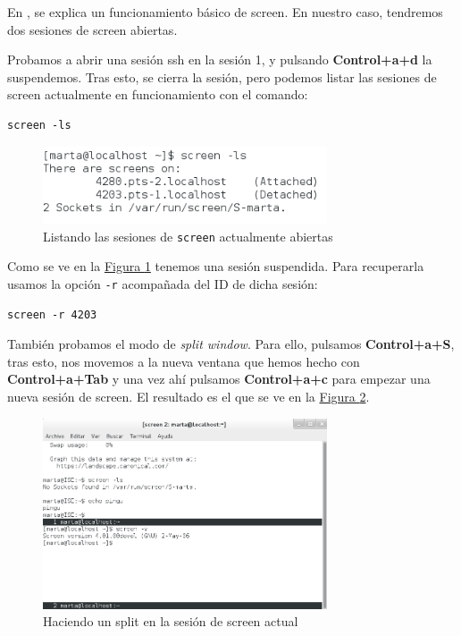 \documentclass[10pt,a4paper,spanish]{article}
\numberwithin{equation}{section} %
\numberwithin{figure}{section} %
\numberwithin{table}{section} %
\begin{document}
En \cite{screen}, se explica un funcionamiento básico de screen. En nuestro caso, tendremos dos sesiones de screen abiertas.

Probamos a abrir una sesión ssh en la sesión 1, y pulsando \textbf{Control+a+d} la suspendemos. Tras esto, se cierra la sesión, pero podemos listar las sesiones de screen actualmente en funcionamiento con el comando:

\begin{verbatim}
screen -ls
\end{verbatim}

\begin{figure}[!h]
\centering
\includegraphics[width=0.75\textwidth]{2_51}
\caption{Listando las sesiones de \texttt{screen} actualmente abiertas}
\label{screenlist}
\end{figure}

Como se ve en la \hyperref[screenlist]{Figura \ref*{screenlist}} tenemos una sesión suspendida. Para recuperarla usamos la opción \texttt{-r} acompañada del ID de dicha sesión:

\begin{verbatim}
screen -r 4203 
\end{verbatim}

También probamos el modo de \textit{split window}. Para ello, pulsamos \textbf{Control+a+S}, tras esto, nos movemos a la nueva ventana que hemos hecho con \textbf{Control+a+Tab} y una vez ahí pulsamos \textbf{Control+a+c} para empezar una nueva sesión de screen. El resultado es el que se ve en la \hyperref[split]{Figura \ref*{split}}. 

\begin{figure}[!h]
\centering
\includegraphics[width=0.75\textwidth]{2_17}
\caption{Haciendo un split en la sesión de screen actual}
\label{split}
\end{figure}
\end{document}
